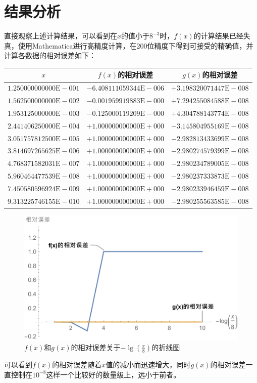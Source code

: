 \documentclass[11pt]{article}
\begin{document}
\section{结果分析}
直接观察上述计算结果，可以看到在$x$的值小于$8^{-3}$时，$f(x)$的计算结果已经失真，使用Mathematica进行高精度计算，在200位精度下得到可接受的精确值，并计算各数据的相对误差如下：
\begin{table}[h]
    \centering
    \begin{tabular}{|c|c|c|}
        \hline
        $x$                            & $f(x)$的相对误差                & $g(x)$的相对误差                \\ \hline
        $1.250000000000\text{E}{-}001$ & $-6.408111059344\text{E}{-}006$ & $+3.198320071447\text{E}{-}008$ \\ \hline
        $1.562500000000\text{E}{-}002$ & $-0.001959919883\text{E}{-}000$ & $+7.294255084588\text{E}{-}008$ \\ \hline
        $1.953125000000\text{E}{-}003$ & $-0.125000119209\text{E}{-}000$ & $+4.304788143774\text{E}{-}008$ \\ \hline
        $2.441406250000\text{E}{-}004$ & $+1.000000000000\text{E}{+}000$ & $-3.145804955169\text{E}{-}008$ \\ \hline
        $3.051757812500\text{E}{-}005$ & $+1.000000000000\text{E}{+}000$ & $-2.982813433699\text{E}{-}008$ \\ \hline
        $3.814697265625\text{E}{-}006$ & $+1.000000000000\text{E}{+}000$ & $-2.980274579399\text{E}{-}008$ \\ \hline
        $4.768371582031\text{E}{-}007$ & $+1.000000000000\text{E}{+}000$ & $-2.980234789005\text{E}{-}008$ \\ \hline
        $5.960464477539\text{E}{-}008$ & $+1.000000000000\text{E}{+}000$ & $-2.980237333873\text{E}{-}008$ \\ \hline
        $7.450580596924\text{E}{-}009$ & $+1.000000000000\text{E}{+}000$ & $-2.980233946459\text{E}{-}008$ \\ \hline
        $9.313225746155\text{E}{-}010$ & $+1.000000000000\text{E}{+}000$ & $-2.980255563585\text{E}{-}008$ \\ \hline
    \end{tabular}
\end{table}
\begin{figure}
    \centering
    \includegraphics[width = 0.7\columnwidth]{./Question1/Part1_RelativeError.pdf}
    \caption{$f(x)$和$g(x)$的相对误差关于$-\lg{\left(\frac{x}{8}\right)}$的折线图}
\end{figure}
可以看到$f(x)$的相对误差随着$x$值的减小而迅速增大，同时$g(x)$的相对误差一直控制在$10^{-8}$这样一个比较好的数量级上，远小于前者。
\end{document}
